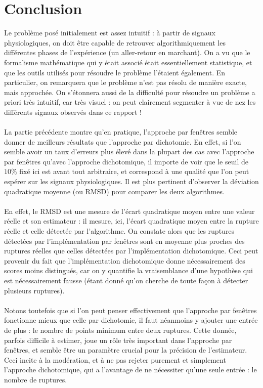 \documentclass[french,11pt,notitlepage]{report}
\begin{document}
		
	
	\chapter{Conclusion}
	
	
	
	Le problème posé initialement est assez intuitif : à partir de signaux physiologiques, on doit être capable de retrouver algorithmiquement les différentes phases de l'expérience (un aller-retour en marchant). On a vu que le formalisme mathématique qui y était associé était essentiellement statistique, et que les outils utilisés pour résoudre le problème l'étaient également. En particulier, on remarquera que le problème n'est pas résolu de manière exacte, mais approchée. On s'étonnera aussi de la difficulté pour résoudre un problème a priori très intuitif, car très visuel : on peut clairement segmenter à vue de nez les différents signaux observés dans ce rapport !
	\\ \\
	La partie précédente montre qu'en pratique, l'approche par fenêtres semble donner de meilleurs résultats que l'approche par dichotomie. En effet, si l'on semble avoir un taux d'erreurs plus élevé dans la plupart des cas avec l'approche par fenêtres qu'avec l'approche dichotomique, il importe de voir que le seuil de $10\%$ fixé ici est avant tout arbitraire, et correspond à une qualité que l'on peut espérer sur les signaux physiologiques. Il est plus pertinent d'observer la déviation quadratique moyenne (ou RMSD) pour comparer les deux algorithmes.
	\\ \\
	En effet, le RMSD est une mesure de l'écart quadratique moyen entre une valeur réelle et son estimateur : il mesure, ici, l'écart quadratique moyen entre la rupture réelle et celle détectée par l'algorithme. On constate alors que les ruptures détectées par l'implémentation par fenêtres sont en moyenne plus proches des ruptures réelles que celles détectées par l'implémentation dichotomique. Ceci peut provenir du fait que l'implémentation dichotomique donne nécessairement des scores moins distingués, car on y quantifie la vraisemblance d'une hypothèse qui est nécessairement fausse (étant donné qu'on cherche de toute façon à détecter plusieurs ruptures).
	\\ \\
	Notons toutefois que si l'on peut penser effectivement que l'approche par fenêtres fonctionne mieux que celle par dichotomie, il faut néanmoins y ajouter une entrée de plus : le nombre de points minimum entre deux ruptures. Cette donnée, parfois difficile à estimer, joue un rôle très important dans l'approche par fenêtres, et semble être un paramètre crucial pour la précision de l'estimateur. Ceci incite à la modération, et à ne pas rejeter purement et simplement l'approche dichotomique, qui a l'avantage de ne nécessiter qu'une seule entrée : le nombre de ruptures.
	


	
\end{document}
